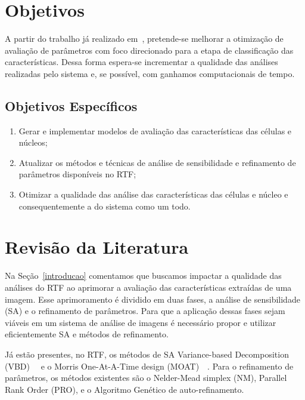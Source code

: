 \documentclass[a4paper,10pt]{article}
\begin{document}
\section{Objetivos}

A partir do trabalho já realizado em~\cite{globalsensitibity}, pretende-se melhorar a otimização de avaliação de parâmetros com foco direcionado para a etapa de classificação das características. Dessa forma espera-se incrementar a qualidade das análises realizadas pelo sistema e, se possível, com ganhamos computacionais de tempo.


\subsection{Objetivos Específicos}

\begin{enumerate}
	\item  Gerar e implementar modelos de avaliação das características das células e núcleos;
\item  Atualizar os métodos e técnicas de análise de sensibilidade e refinamento de parâmetros disponíveis no RTF;
\item Otimizar a qualidade das análise das características das células e núcleo e consequentemente a do sistema como um todo.
\end{enumerate}


\section{Revisão da Literatura}


Na Seção~\ref{introducao} comentamos que buscamos impactar a qualidade das análises do RTF ao aprimorar a avaliação das características extraídas de uma imagem. Esse aprimoramento é dividido em duas fases, a análise de sensibilidade (SA) e o refinamento de parâmetros. Para que a aplicação dessas fases sejam viáveis em um sistema de análise de imagens é necessário propor e utilizar eficientemente SA e métodos de refinamento.


Já estão presentes, no RTF, os métodos de SA Variance-based Decomposition (VBD)~\cite{weirs2012sensitivity}~\cite{sobol2001global}  e o Morris One-At-A-Time design (MOAT)~\cite{morris1991factorial}~\cite{campolongo2007effective}. Para o refinamento de parâmetros, os métodos existentes são o Nelder-Mead simplex (NM), Parallel Rank Order (PRO), e o Algoritmo Genético de auto-refinamento. 
\end{document}
